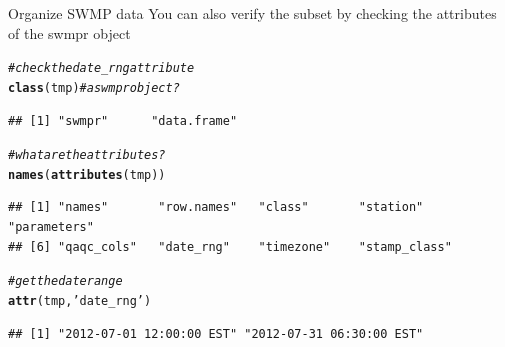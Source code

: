 \documentclass[xcolor=svgnames]{beamer}\usepackage[]{graphicx}\usepackage[]{color}
\makeatletter
\newcommand{\hlstr}[1]{\textcolor[rgb]{0.192,0.494,0.8}{#1}}%
\newcommand{\hlcom}[1]{\textcolor[rgb]{0.678,0.584,0.686}{\textit{#1}}}%
\newcommand{\hlstd}[1]{\textcolor[rgb]{0.345,0.345,0.345}{#1}}%
\newcommand{\hlkwd}[1]{\textcolor[rgb]{0.737,0.353,0.396}{\textbf{#1}}}%
\newenvironment{kframe}{%
 \def\at@end@of@kframe{}%
 \ifinner\ifhmode%
  \def\at@end@of@kframe{\end{minipage}}%
  \begin{minipage}{\columnwidth}%
 \fi\fi%
 \def\FrameCommand##1{\hskip\@totalleftmargin \hskip-\fboxsep
 \colorbox{shadecolor}{##1}\hskip-\fboxsep
     \hskip-\linewidth \hskip-\@totalleftmargin \hskip\columnwidth}%
 \MakeFramed {\advance\hsize-\width
   \@totalleftmargin\z@ \linewidth\hsize
   \@setminipage}}%
 {\par\unskip\endMakeFramed%
 \at@end@of@kframe}
\newenvironment{knitrout}{}{} %
\makeatother
\begin{document}
\begin{frame}[containsverbatim]{Organize SWMP data}
You can also verify the subset by checking the attributes of the swmpr object
\begin{knitrout}\scriptsize
{}\color{fgcolor}\begin{kframe}
\begin{alltt}
\hlcom{# check the date_rng attribute}
\hlkwd{class}\hlstd{(tmp)} \hlcom{# a swmpr object?}
\end{alltt}
\begin{verbatim}
## [1] "swmpr"      "data.frame"
\end{verbatim}
\begin{alltt}
\hlcom{# what are the attributes?}
\hlkwd{names}\hlstd{(}\hlkwd{attributes}\hlstd{(tmp))}
\end{alltt}
\begin{verbatim}
## [1] "names"       "row.names"   "class"       "station"     "parameters" 
## [6] "qaqc_cols"   "date_rng"    "timezone"    "stamp_class"
\end{verbatim}
\begin{alltt}
\hlcom{# get the date range}
\hlkwd{attr}\hlstd{(tmp,} \hlstr{'date_rng'}\hlstd{)}
\end{alltt}
\begin{verbatim}
## [1] "2012-07-01 12:00:00 EST" "2012-07-31 06:30:00 EST"
\end{verbatim}
\end{kframe}
\end{knitrout}
\end{frame}
\end{document}
